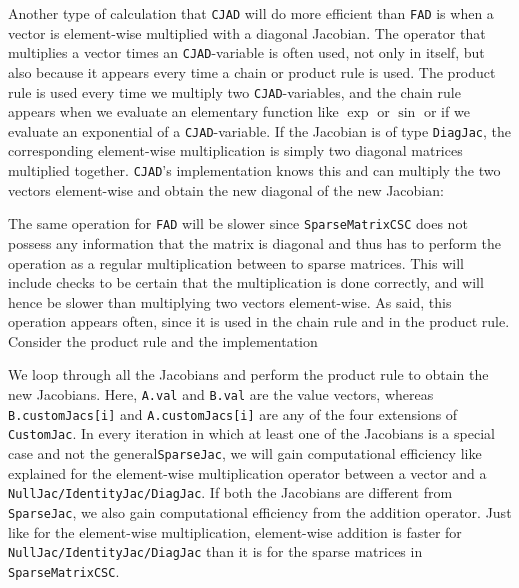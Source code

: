Another type of calculation that \texttt{CJAD} will do more efficient than \texttt{FAD} is when a vector is element-wise multiplied with a diagonal Jacobian. The operator that multiplies a vector times an \texttt{CJAD}-variable is often used, not only in itself, but also because it appears every time a chain or product rule is used. The product rule is used every time we multiply two \texttt{CJAD}-variables, and the chain rule appears when we evaluate an elementary function like $\exp$ or $\sin$ or if we evaluate an exponential of a \texttt{CJAD}-variable. If the Jacobian is of type \texttt{DiagJac}, the corresponding element-wise multiplication is simply two diagonal matrices multiplied together. \texttt{CJAD}'s implementation knows this and can multiply the two vectors element-wise and obtain the new diagonal of the new Jacobian:

The same operation for \texttt{FAD} will be slower since \texttt{SparseMatrixCSC} does not possess any information that the matrix is diagonal and thus has to perform the operation as a regular multiplication between to sparse matrices. This will include checks to be certain that the multiplication is done correctly, and will hence be slower than multiplying two vectors element-wise. As said, this operation appears often, since it is used in the chain rule and in the product rule. Consider the product rule and the implementation

We loop through all the Jacobians and perform the product rule to obtain the new Jacobians.  Here, \texttt{A.val} and \texttt{B.val} are the value vectors, whereas \texttt{B.customJacs[i]} and \texttt{A.customJacs[i]} are any of the four extensions of \texttt{CustomJac}. In every iteration in which at least one of the Jacobians is a special case and not the general\texttt{SparseJac}, we will gain computational efficiency like explained for the element-wise multiplication operator between a vector and a \texttt{NullJac/IdentityJac/DiagJac}. If both the Jacobians are different from \texttt{SparseJac}, we also gain computational efficiency from the addition operator. Just like for the element-wise multiplication, element-wise addition is faster for \texttt{NullJac/IdentityJac/DiagJac} than it is for the sparse matrices in \texttt{SparseMatrixCSC}.

